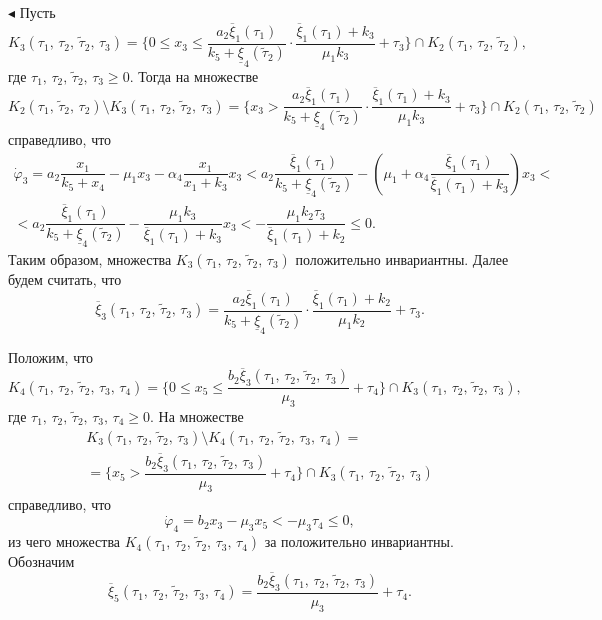 \documentclass[12pt,a4paper]{extarticle}
\renewenvironment{proof}{\noindent$\blacktriangleleft$}{}
\theoremstyle{definition}
\theoremstyle{definition}
\theoremstyle{definition}
\begin{document}
\begin{proof}
		Пусть 
		\[K_3(\tau_1,\,\tau_2,\, \tilde{\tau}_2,\,\tau_3) = \{0 \le x_3 \le \dfrac{a_2\overline{\xi}_1(\tau_1)}{k_5+\underline{\xi}_4(\tilde{\tau}_2)}\cdot\dfrac{\overline{\xi}_1(\tau_1)+k_3}{\mu_1k_3}+\tau_3\}\cap K_2(\tau_1,\, \tau_2,\, \tilde{\tau}_2),\]
		где $\tau_1,\,\tau_2,\,\tilde{\tau}_2,\,\tau_3 \ge 0$. Тогда на множестве 
		\[K_2(\tau_1,\, \tilde{\tau}_2,\, \tau_2)\setminus K_3(\tau_1,\,\tau_2,\, \tilde{\tau}_2,\, \tau_3)=\{x_3 > \dfrac{a_2\overline{\xi}_1(\tau_1)}{k_5+\underline{\xi}_4(\tilde{\tau}_2)}\cdot\dfrac{\overline{\xi}_1(\tau_1)+k_3}{\mu_1k_3}+\tau_3\}\cap K_2(\tau_1,\, \tau_2,\, \tilde{\tau}_2)\]
		справедливо, что
		\begin{multline*}
		\dot{\varphi}_3 = a_2\dfrac{x_1}{k_5+x_4}-\mu_1x_3-\alpha_4\dfrac{x_1}{x_1+k_3}x_3 < a_2\dfrac{\overline{\xi}_1(\tau_1)}{k_5+\underline{\xi}_4(\tilde{\tau}_2)}-\left(\mu_1+\alpha_4\dfrac{\overline{\xi}_1(\tau_1)}{\overline{\xi}_1(\tau_1)+k_3}\right) x_3 <\\
		< a_2\dfrac{\overline{\xi}_1(\tau_1)}{k_5+\underline{\xi}_4(\tilde{\tau}_2)}-\dfrac{\mu_1k_3}{\overline{\xi}_1(\tau_1)+k_3} x_3 < -\dfrac{\mu_1k_2\tau_3}{\overline{\xi}_1(\tau_1)+k_2} \le 0.
		\end{multline*}
		Таким образом, множества $K_3(\tau_1,\,\tau_2,\, \tilde{\tau}_2,\, \tau_3)$ положительно инвариантны. Далее будем считать, что
		\[\overline{\xi}_3(\tau_1,\,\tau_2,\, \tilde{\tau}_2,\, \tau_3) = \dfrac{a_2\overline{\xi}_1(\tau_1)}{k_5+\underline{\xi}_4(\tilde{\tau}_2)}\cdot\dfrac{\overline{\xi}_1(\tau_1)+k_2}{\mu_1k_2} + \tau_3.\]
		
		Положим, что 
		\[K_4(\tau_1,\,\tau_2,\, \tilde{\tau}_2,\, \tau_3,\,\tau_4) = \{0 \le x_5 \le \dfrac{b_2\overline{\xi}_3(\tau_1,\,\tau_2,\, \tilde{\tau}_2,\, \tau_3)}{\mu_3}+\tau_4\}\cap K_3(\tau_1,\,\tau_2,\, \tilde{\tau}_2,\, \tau_3),\]
		где $\tau_1,\,\tau_2,\, \tilde{\tau}_2,\, \tau_3,\,\tau_4 \ge 0$. На множестве 
		\begin{multline*}
			K_3(\tau_1,\,\tau_2,\, \tilde{\tau}_2,\, \tau_3)\setminus K_4(\tau_1,\,\tau_2,\,\tilde{\tau}_2,\,\tau_3,\,\tau_4) =\\
			=\{x_5 > \dfrac{b_2\overline{\xi}_3(\tau_1,\,\tau_2,\,\tilde{\tau}_2,\,\tau_3)}{\mu_3}+\tau_4\}\cap K_3(\tau_1,\,\tau_2,\, \tilde{\tau}_2,\, \tau_3)
		\end{multline*}
		справедливо, что
		\[\dot{\varphi}_4 = b_2x_3 - \mu_3x_5 < -\mu_3\tau_4 \le 0,\]
		из чего множества $K_4(\tau_1,\,\tau_2,\,\tilde{\tau}_2,\,\tau_3,\,\tau_4)$ за положительно инвариантны. Обозначим
		\[\overline{\xi}_5(\tau_1,\,\tau_2,\,\tilde{\tau}_2,\,\tau_3,\,\tau_4) = \dfrac{b_2\overline{\xi}_3(\tau_1,\,\tau_2,\,\tilde{\tau}_2,\,\tau_3)}{\mu_3}+\tau_4.\]
		

\end{proof}
\end{document}
